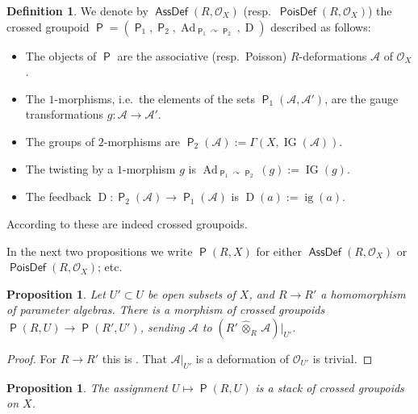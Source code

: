 \documentclass[a4paper, 10pt]{amsart}
\newtheorem{prop}[equation]{Proposition}
\theoremstyle{definition}
\newtheorem{dfn}[equation]{Definition}
\numberwithin{equation}{section}
\newcommand{\opn}{\operatorname}
\newcommand{\cat}[1]{\operatorname{\mathsf{#1}}}
\newcommand{\mcal}[1]{\mathcal{#1}}
\newcommand{\hatotimes}[1]{\, \what{{\otimes}}_{#1} \,}
\newcommand{\what}[1]{\widehat{#1}}
\newcommand{\crvar}{\curvearrowright}
\begin{document}
\begin{dfn} \label{dfn:233}
We denote by $\cat{AssDef}(R, \mcal{O}_X)$ (resp.\ 
$\cat{PoisDef}(R, \mcal{O}_X)$) the crossed groupoid 
$\cat{P} = (\cat{P}_1, \cat{P}_2, 
\opn{Ad}_{\cat{P}_1 \crvar \cat{P}_{2}}, \opn{D})$
described as follows:
\begin{itemize}
\item The objects of $\cat{P}$ are the associative (resp.\ Poisson)
$R$-deformations $\mcal{A}$ of $\mcal{O}_X$.

\item The $1$-morphisms, i.e.\ the elements of the sets
$\cat{P}_1(\mcal{A}, \mcal{A}')$, are the gauge transformations 
$g : \mcal{A} \to \mcal{A}'$.

\item The groups of $2$-morphisms are
$\cat{P}_2(\mcal{A}) := \Gamma(X, \opn{IG}(\mcal{A}))$.

\item The twisting by a $1$-morphism $g$ is 
$\opn{Ad}_{\cat{P}_1 \crvar \cat{P}_{2}}(g) := \opn{IG}(g)$.

\item The feedback 
$\opn{D} : \cat{P}_2(\mcal{A}) \to \cat{P}_1(\mcal{A})$ is
$\opn{D}(a) := \opn{ig}(a)$.
\end{itemize}
\end{dfn}

According to \cite[Proposition 5.7]{Ye9} these are indeed crossed groupoids.

In the next two propositions we write $\cat{P}(R, X)$ for either 
$\cat{AssDef}(R, \mcal{O}_X)$ or $\cat{PoisDef}(R, \mcal{O}_X)$; etc.

\begin{prop} \label{prop:206}
Let $U' \subset U$ be open subsets of $X$, and $R \to R'$ a homomorphism of
parameter algebras.  There is a morphism of crossed groupoids 
$\cat{P}(R, U) \to \cat{P}(R', U')$,
sending $\mcal{A}$ to $(R' \hatotimes{R} \mcal{A})|_{U'}$. 
\end{prop}

\begin{proof}
For $R \to R'$ this is \cite[Proposition 5.8]{Ye9}. That 
$\mcal{A}|_{U'}$ is a deformation of $\mcal{O}_{U'}$ is trivial. 
\end{proof}

\begin{prop} \label{prop:210}
The assignment 
$U \mapsto \cat{P}(R, U)$
is a stack of crossed groupoids on $X$. 
\end{prop}
\end{document}

